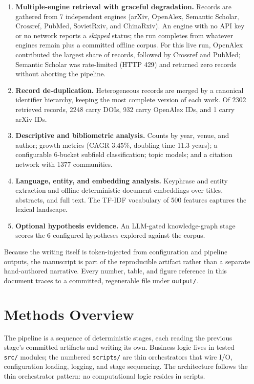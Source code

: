 \documentclass[
  english,
]{article}
\begin{document}
\begin{enumerate}
\def\labelenumi{\arabic{enumi}.}
\item
  \textbf{Multiple-engine retrieval with graceful degradation.} Records
  are gathered from 7 independent engines (arXiv, OpenAlex, Semantic
  Scholar, Crossref, PubMed, SovietRxiv, and ChinaRxiv). An engine with
  no API key or no network reports a \emph{skipped} status; the run
  completes from whatever engines remain plus a committed offline
  corpus. For this live run, OpenAlex contributed the largest share of
  records, followed by Crossref and PubMed; Semantic Scholar was
  rate-limited (HTTP 429) and returned zero records without aborting the
  pipeline.
\item
  \textbf{Record de-duplication.} Heterogeneous records are merged by a
  canonical identifier hierarchy, keeping the most complete version of
  each work. Of 2302 retrieved records, 2248 carry DOIs, 932 carry
  OpenAlex IDs, and 1 carry arXiv IDs.
\item
  \textbf{Descriptive and bibliometric analysis.} Counts by year, venue,
  and author; growth metrics (CAGR 3.45\%, doubling time 11.3 years); a
  configurable 6-bucket subfield classification; topic models; and a
  citation network with 1377 communities.
\item
  \textbf{Language, entity, and embedding analysis.} Keyphrase and
  entity extraction and offline deterministic document embeddings over
  titles, abstracts, and full text. The TF-IDF vocabulary of 500
  features captures the lexical landscape.
\item
  \textbf{Optional hypothesis evidence.} An LLM-gated knowledge-graph
  stage scores the 6 configured hypotheses explored against the corpus.
\end{enumerate}

Because the writing itself is token-injected from configuration and
pipeline outputs, the manuscript is part of the reproducible artifact
rather than a separate hand-authored narrative. Every number, table, and
figure reference in this document traces to a committed, regenerable
file under \texttt{output/}.

\newpage

\section{Methods Overview}\label{methods-overview}

The pipeline is a sequence of deterministic stages, each reading the
previous stage's committed artifacts and writing its own. Business logic
lives in tested \texttt{src/} modules; the numbered \texttt{scripts/}
are thin orchestrators that wire I/O, configuration loading, logging,
and stage sequencing. The architecture follows the thin orchestrator
pattern: no computational logic resides in scripts.
\end{document}
